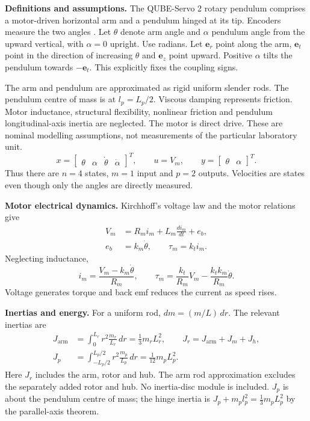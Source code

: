 
\textbf{Definitions and assumptions.}
The QUBE-Servo 2 rotary pendulum comprises a motor-driven horizontal arm
and a pendulum hinged at its tip. Encoders measure the two angles
\cite{qube_manual}. Let $\theta$ denote arm angle and $\alpha$ pendulum
angle from the upward vertical, with $\alpha=0$ upright. Use radians.
Let $\boldsymbol e_r$ point along the arm, $\boldsymbol e_t$ point in the
direction of increasing $\theta$ and $\boldsymbol e_z$ point upward.
Positive $\alpha$ tilts the pendulum towards $-\boldsymbol e_t$.
This explicitly fixes the coupling signs.

The arm and pendulum are approximated as rigid uniform slender rods.
The pendulum centre of mass is at $l_p=L_p/2$. Viscous damping represents
friction. Motor inductance, structural flexibility, nonlinear friction
and pendulum longitudinal-axis inertia are neglected. The motor is direct
drive. These are nominal modelling assumptions, not measurements of
the particular laboratory unit.
\begin{equation}
x=\begin{bmatrix}\theta&\alpha&\dot\theta&\dot\alpha\end{bmatrix}^{T},
\qquad u=V_m,\qquad y=\begin{bmatrix}\theta&\alpha\end{bmatrix}^{T}.
\end{equation}
Thus there are $n=4$ states, $m=1$ input and $p=2$ outputs. Velocities
are states even though only the angles are directly measured.

\textbf{Motor electrical dynamics.}
Kirchhoff's voltage law and the motor relations give
\begin{align}
V_m&=R_mi_m+L_m\frac{di_m}{dt}+e_b,\\
e_b&=k_m\dot\theta,\qquad \tau_m=k_ti_m.
\end{align}
Neglecting inductance,
\begin{equation}\label{eq:motor}
i_m=\frac{V_m-k_m\dot\theta}{R_m},\qquad
\boxed{\tau_m=\frac{k_t}{R_m}V_m-\frac{k_tk_m}{R_m}\dot\theta.}
\end{equation}
Voltage generates torque and back emf reduces the current as speed rises.

\textbf{Inertias and energy.}
For a uniform rod, $dm=(m/L)\,dr$. The relevant inertias are
\begin{align}
J_{\mathrm{arm}}&=\int_0^{L_r}r^2\frac{m_r}{L_r}\,dr
=\frac13m_rL_r^2,\qquad J_r=J_{\mathrm{arm}}+J_m+J_h,\\
J_p&=\int_{-L_p/2}^{L_p/2}r^2\frac{m_p}{L_p}\,dr
=\frac1{12}m_pL_p^2.
\end{align}
Here $J_r$ includes the arm, rotor and hub. The arm rod approximation
excludes the separately added rotor and hub. No inertia-disc module is
included. $J_p$ is about the pendulum centre of mass; the hinge inertia is
$J_p+m_pl_p^2=\frac13m_pL_p^2$ by the parallel-axis theorem.

